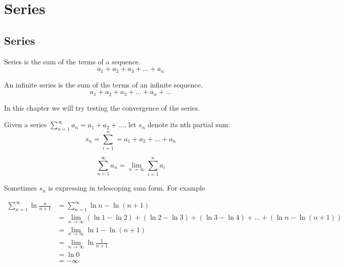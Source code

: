 \chapter{Series}

\section{Series}

\begin{definition}[Series]
  Series is the sum of the terms of a sequence.
  \[
    a_{1} + a_{2} + a_{3} + \dots + a_{n}
  \]
\end{definition}

\begin{definition}
  An infinite series is the sum of the terms of an infinite sequence.
  \[
    a_{1} + a_{2} + a_{3} + \dots + a_{n} + \dots
  \]
\end{definition}

In this chapter we will try testing the convergence of the series.

\begin{definition}
  Given a series \(\sum_{n = 1}^{\infty} a_{n} = a_{1} + a_{2} + \dots\), let \(s_{n}\) denote its nth partial sum:
  \[
    s_{n} = \sum_{i = 1}^{n} = a_{1} + a_{2} + \dots + a_{n}
  \]
\end{definition}

\begin{lemma}
  \[
    \sum_{n = 1}^{\infty} a_{n} = \lim_{n \to \infty} \sum_{i=1}^{n} a_{i}
  \]
\end{lemma}

Sometimes $s_{n}$ is expressing in telescoping sum form. For example

\begin{equation}
  \nonumber
  \begin{aligned}
    \sum_{n=1}^{\infty} \ln{\frac{n}{n + 1}} &= \sum_{n=1}^{\infty} \ln{n} - \ln{(n + 1)} \\
    &= \lim_{n \to \infty} (\ln{1} - \ln{2}) + (\ln{2} - \ln{3}) + (\ln{3} - \ln{4}) + \dots + (\ln{n} - \ln{(n + 1)}) \\
    &= \lim_{n \to \infty} \ln{1} - \ln{(n + 1)} \\
    &= \lim_{n \to \infty} \ln{\frac{1}{n + 1}} \\
    &= \ln{0} \\
    &= -\infty
  \end{aligned}
\end{equation}

